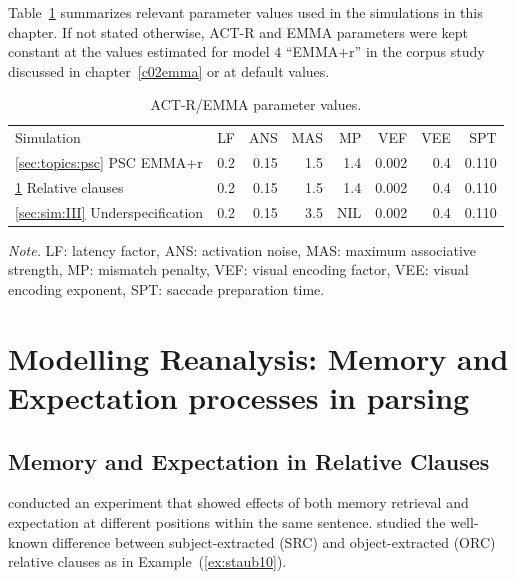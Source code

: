 \documentclass{cambridge7A}\usepackage[]{graphicx}\usepackage[]{color}
\begin{document}
Table~\ref{tab:params} summarizes relevant parameter values used in the simulations in this chapter. If not stated otherwise, ACT-R and EMMA parameters were kept constant at the values estimated for model $4$ ``EMMA+r'' in the corpus study discussed in chapter~\ref{c02emma} or at default values.


\begin{table}[!htbp]
\begin{center}
\begin{threeparttable}
  \begin{tabular}{lrrrrrrr}
  Simulation & LF & ANS & MAS & MP & VEF & VEE & SPT \\
  \ref{sec:topics:psc} PSC EMMA+r & 0.2 & 0.15 & 1.5 & 1.4 & 0.002 & 0.4 & 0.110 \\
  \ref{sec:sim:II} Relative clauses & 0.2 & 0.15 & 1.5 & 1.4 & 0.002 & 0.4 & 0.110 \\
  \ref{sec:sim:III} Underspecification & 0.2 & 0.15 & 3.5 & NIL & 0.002 & 0.4 & 0.110 \\
  \end{tabular}
  \begin{tablenotes}
    \item \emph{Note.} LF: latency factor, ANS: activation noise, MAS: maximum associative strength, MP: mismatch penalty, VEF: visual encoding factor, VEE: visual encoding exponent, SPT: saccade preparation time.
  \end{tablenotes}
\end{threeparttable}
\end{center}
  \caption{ACT-R/EMMA parameter values.}  \label{tab:params}
\end{table}

\section[Modelling Reanalysis]{Modelling Reanalysis: Memory and Expectation processes in parsing}\label{sec:sim:II}
\subsection{Memory and Expectation in Relative Clauses}

\cite{Staub2010a} conducted an experiment that showed effects of both memory retrieval and expectation at different positions within the same sentence. \cite{Staub2010a} studied the well-known difference between subject-extracted (SRC) and object-extracted (ORC) relative clauses as in Example~(\ref{ex:staub10}).
\end{document}

